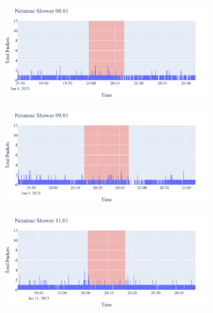 \begin{figure}[H]
    \begin{subfigure}[b]{0.47\textwidth}
        \centering
        \includegraphics[width=1.2\hsize]{figures/Netatmo_Shower_Packets_08.01.png}
    \end{subfigure}
    \begin{subfigure}[b]{0.47\textwidth}
        \centering
        \includegraphics[width=1.2\hsize]{figures/Netatmo_Shower_Packets_09.01.png}
    \end{subfigure}
    \begin{subfigure}[b]{0.47\textwidth}
        \centering
        \includegraphics[width=1.2\hsize]{figures/Netatmo_Shower_Packets_11.01.png}
    \end{subfigure}

\end{figure}
